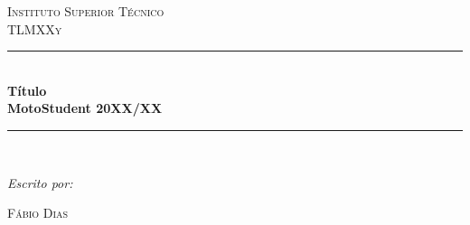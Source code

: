 \begin{titlepage}
\thispagestyle{date}
\newcommand{\HRule}{\rule{\linewidth}{0.5mm}} %

\center %
\vspace*{1cm} 

\textsc{\LARGE Instituto Superior Técnico}\\[1.5cm] %
\textsc{\Large  TLMXXy}\\[0.5cm] %


\HRule \\[0.4cm]
{ \LARGE \bfseries Título}\\[0.4cm] %
{ \large \bfseries MotoStudent 20XX/XX}\\[0.4cm] %
\HRule \\[1.5cm]
 

\begin{minipage}{0.4\textwidth}
\begin{flushleft} \large
\emph{Escrito por:}
\par
\textsc{Fábio Dias}\\
\textsc{}


\end{flushleft}
\end{minipage}
\begin{minipage}{0.4\textwidth}
\begin{flushright} \large
\end{flushright}
\end{minipage}\\[3cm]

\begin{center} \large
 

\end{center}
\end{titlepage}
